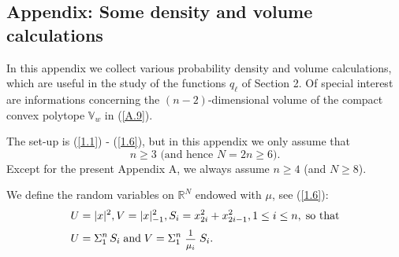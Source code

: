 \documentclass[12pt,leqno]{article}
\def\IR{{\mathbb R}}
\def\IV{{\mathbb V}}
\def\dis{\displaystyle}
\def\f{\footnotesize}
\begin{document}
\begin{appendix}
\section{Appendix: Some density and volume calculations}
\setcounter{equation}{0}

In this appendix we collect various probability density and volume calculations, which are useful in the study of the functions $q_\ell$ of Section 2. Of special interest are informations concerning the $(n-2)$-dimensional volume of the compact convex polytope $\IV_w$ in (\ref{A.9}).

\medskip
The set-up is (\ref{1.1}) - (\ref{1.6}), but in this appendix we only assume that
\begin{equation}\label{A.1}
\mbox{$n \ge 3$ (and hence $N = 2n \ge 6$)}.
\end{equation}
Except for the present Appendix A, we always assume $n \ge 4$ (and $N \ge 8$).

\bigskip
We define the random variables on $\IR^N$ endowed with $\mu$, see (\ref{1.6}):
\begin{equation}\label{A.2}
\begin{split}
U &=  |x|^2, V = |x|^2_{-1}, S_i = x^2_{2i} + x^2_{2 i - 1}, 1 \le i \le n, \; \mbox{so that}
\\[0.5ex]
U &=  \Sigma^n_1 \,S_i \; \mbox{and} \; V = \Sigma^n_1 \; \mbox{\f $\dis\frac{1}{\mu_i}$} \; S_i .
\end{split}
\end{equation}


\end{appendix}
\end{document}
